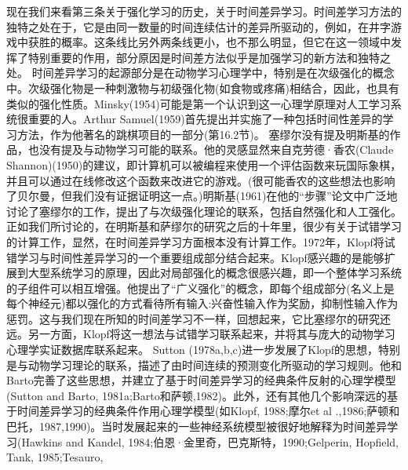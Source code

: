 现在我们来看第三条关于强化学习的历史，关于时间差异学习。时间差学习方法的独特之处在于，它是由同一数量的时间连续估计的差异所驱动的，例如，在井字游戏中获胜的概率。这条线比另外两条线更小，也不那么明显，但它在这一领域中发挥了特别重要的作用，部分原因是时间差方法似乎是加强学习的新方法和独特之处。
时间差异学习的起源部分是在动物学习心理学中，特别是在次级强化的概念中。次级强化物是一种刺激物与初级强化物(如食物或疼痛)相结合，因此，也具有类似的强化性质。Minsky(1954)可能是第一个认识到这一心理学原理对人工学习系统很重要的人。Arthur Samuel(1959)首先提出并实施了一种包括时间性差异的学习方法，作为他著名的跳棋项目的一部分(第16.2节)。
塞缪尔没有提及明斯基的作品，也没有提及与动物学习可能的联系。他的灵感显然来自克劳德·香农(Claude Shannon)(1950)的建议，即计算机可以被编程来使用一个评估函数来玩国际象棋，并且可以通过在线修改这个函数来改进它的游戏。(很可能香农的这些想法也影响了贝尔曼，但我们没有证据证明这一点。)明斯基(1961)在他的“步骤”论文中广泛地讨论了塞缪尔的工作，提出了与次级强化理论的联系，包括自然强化和人工强化。
正如我们所讨论的，在明斯基和萨缪尔的研究之后的十年里，很少有关于试错学习的计算工作，显然，在时间差异学习方面根本没有计算工作。1972年，Klopf将试错学习与时间性差异学习的一个重要组成部分结合起来。Klopf感兴趣的是能够扩展到大型系统学习的原理，因此对局部强化的概念很感兴趣，即一个整体学习系统的子组件可以相互增强。他提出了“广义强化”的概念，即每个组成部分(名义上是每个神经元)都以强化的方式看待所有输入:兴奋性输入作为奖励，抑制性输入作为惩罚。这与我们现在所知的时间差学习不一样，回想起来，它比塞缪尔的研究还远。另一方面，Klopf将这一想法与试错学习联系起来，并将其与庞大的动物学习心理学实证数据库联系起来。
Sutton (1978a,b,c)进一步发展了Klopf的思想，特别是与动物学习理论的联系，描述了由时间连续的预测变化所驱动的学习规则。他和Barto完善了这些思想，并建立了基于时间差异学习的经典条件反射的心理学模型(Sutton and Barto, 1981a;Barto和萨顿,1982)。此外，还有其他几个影响深远的基于时间差异学习的经典条件作用心理学模型(如Klopf, 1988;摩尔et al .,1986;萨顿和巴托，1987,1990)。当时发展起来的一些神经系统模型被很好地解释为时间差异学习(Hawkins and Kandel, 1984;伯恩·金里奇，巴克斯特，1990;Gelperin, Hopfield, Tank, 1985;Tesauro,

